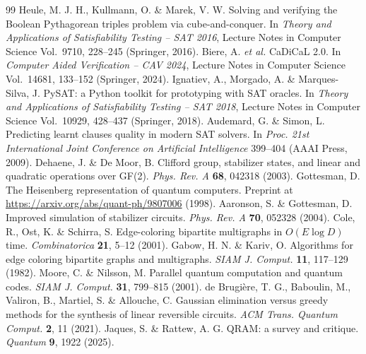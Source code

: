 \documentclass[reprint,twocolumn,superscriptaddress,nofootinbib]{revtex4-2}
\theoremstyle{plain}
\begin{document}
\begin{thebibliography}{99}
 Heule, M. J. H., Kullmann, O. \& Marek, V. W. Solving and verifying the Boolean Pythagorean triples problem via cube-and-conquer. In \emph{Theory and Applications of Satisfiability Testing -- SAT 2016}, Lecture Notes in Computer Science Vol.~9710, 228--245 (Springer, 2016).
 Biere, A. \emph{et al.} CaDiCaL 2.0. In \emph{Computer Aided Verification -- CAV 2024}, Lecture Notes in Computer Science Vol.~14681, 133--152 (Springer, 2024).
 Ignatiev, A., Morgado, A. \& Marques-Silva, J. PySAT: a Python toolkit for prototyping with SAT oracles. In \emph{Theory and Applications of Satisfiability Testing -- SAT 2018}, Lecture Notes in Computer Science Vol.~10929, 428--437 (Springer, 2018).
 Audemard, G. \& Simon, L. Predicting learnt clauses quality in modern SAT solvers. In \emph{Proc. 21st International Joint Conference on Artificial Intelligence} 399--404 (AAAI Press, 2009).
 Dehaene, J. \& De Moor, B. Clifford group, stabilizer states, and linear and quadratic operations over GF(2). \emph{Phys. Rev. A} \textbf{68}, 042318 (2003).
 Gottesman, D. The Heisenberg representation of quantum computers. Preprint at \url{https://arxiv.org/abs/quant-ph/9807006} (1998).
 Aaronson, S. \& Gottesman, D. Improved simulation of stabilizer circuits. \emph{Phys. Rev. A} \textbf{70}, 052328 (2004).
 Cole, R., Ost, K. \& Schirra, S. Edge-coloring bipartite multigraphs in $O(E\log D)$ time. \emph{Combinatorica} \textbf{21}, 5--12 (2001).
 Gabow, H. N. \& Kariv, O. Algorithms for edge coloring bipartite graphs and multigraphs. \emph{SIAM J. Comput.} \textbf{11}, 117--129 (1982).
 Moore, C. \& Nilsson, M. Parallel quantum computation and quantum codes. \emph{SIAM J. Comput.} \textbf{31}, 799--815 (2001).
 de Brugi\`ere, T. G., Baboulin, M., Valiron, B., Martiel, S. \& Allouche, C. Gaussian elimination versus greedy methods for the synthesis of linear reversible circuits. \emph{ACM Trans. Quantum Comput.} \textbf{2}, 11 (2021).
 Jaques, S. \& Rattew, A. G. QRAM: a survey and critique. \emph{Quantum} \textbf{9}, 1922 (2025).
\end{thebibliography}
\end{document}
